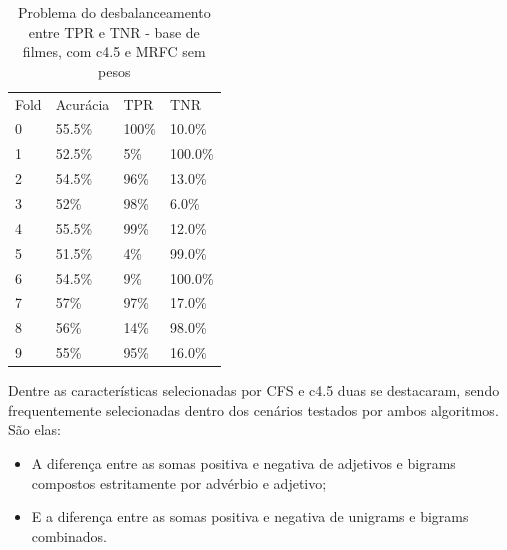 \documentclass[template.tex]{subfiles}
\begin{document}

\begin{table}[htbp]
	\centering
    \begin{tabular}{llll}
    Fold & Acurácia & TPR & TNR \\
    0 & 55.5\% & 100\% & 10.0\% \\
    1 & 52.5\% & 5\% & 100.0\% \\
    2 & 54.5\% & 96\% & 13.0\% \\
    3 & 52\% & 98\% & 6.0\% \\
    4 & 55.5\% & 99\% & 12.0\% \\
    5 & 51.5\% & 4\% & 99.0\% \\
    6 & 54.5\% & 9\% & 100.0\% \\
    7 & 57\% & 97\% & 17.0\% \\
    8 & 56\% & 14\% & 98.0\% \\
    9 & 55\% & 95\% & 16.0\% \\
    \end{tabular}
    \caption{Problema do desbalanceamento entre TPR e TNR - base de filmes, com c4.5 e MRFC sem pesos}
    \label{table:movie_folds}
\end{table}


Dentre as características selecionadas por CFS e c4.5 duas se destacaram, sendo frequentemente selecionadas dentro dos cenários testados por ambos algoritmos. São elas:

\begin{itemize}
\item A diferença entre as somas positiva e negativa de adjetivos e bigrams compostos estritamente por advérbio e adjetivo;
\item E a diferença entre as somas positiva e negativa de unigrams e bigrams combinados.
\end{itemize}
\end{document}

